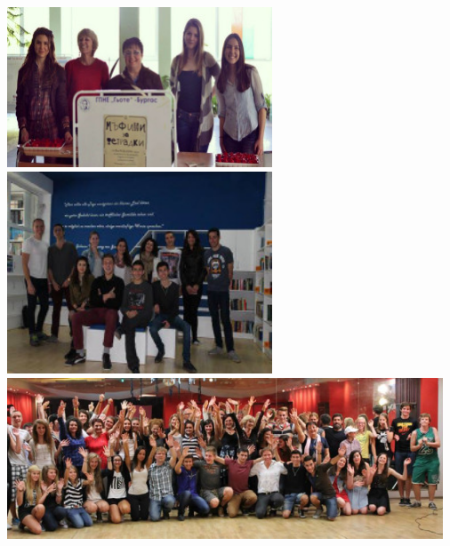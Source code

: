 \begin{center}
\includegraphics[width=3.1in]{./Komenski/1.jpg} \quad \includegraphics[width=3.1in]{./Komenski/2.jpg} \\
\includegraphics[width=5.1in]{./Komenski/3.jpg}
\end{center}

 
\closearticle


